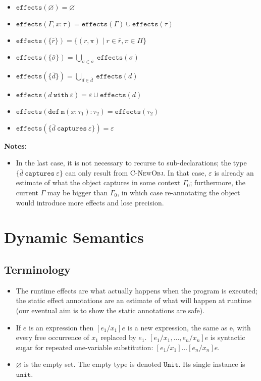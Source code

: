 \documentclass{llncs}
\newcommand{\keywadj}[1]{\mathtt{#1}}
\newcommand{\keyw}[1]{\keywadj{#1}~}
\begin{document}
\begin{itemize}
	\item $\keywadj{effects}(\varnothing) = \varnothing$
	\item $\keywadj{effects}(\Gamma, x : \tau) = \keywadj{effects}(\Gamma) \cup \keywadj{effects}(\tau)$
	\item $\keywadj{effects}(\{\bar r\}) = \{ (r, \pi) \mid r \in \bar r, \pi \in \Pi \}$
	\item $\keywadj{effects}(\{\bar \sigma\}) = \bigcup_{\sigma \in \bar \sigma}~\keywadj{effects}(\sigma)$
	\item $\keywadj{effects}(\{\bar d\}) = \bigcup_{d \in \bar d}~\keywadj{effects}(d)$
	\item $\keywadj{effects}(d~\keyw{with} \varepsilon) = \varepsilon \cup \keywadj{effects}(d)$
	\item $\keywadj{effects}(\keywadj{def~m}(x : \tau_1) : \tau_2) = \keywadj{effects}(\tau_2)$
	\item $\keywadj{effects}(\{\bar d ~\keyw{captures} \varepsilon\}) = \varepsilon$
\end{itemize}

\noindent \textbf{Notes:}
\begin{itemize}
	\item In the last case, it is not necessary to recurse to sub-declarations; the type $\{ \bar d~\keyw{captures} \varepsilon \}$ can only result from \textsc{C-NewObj}. In that case, $\varepsilon$ is already an estimate of what the object captures in some context $\Gamma_0$; furthermore, the current $\Gamma$ may be bigger than $\Gamma_0$, in which case re-annotating the object would introduce more effects and lose precision.
\end{itemize}
\newpage


\section{Dynamic Semantics}

\subsection{Terminology}

\begin{itemize}
	\item The runtime effects are what actually happens when the program is executed; the static effect annotations are an estimate of what will happen at runtime (our eventual aim is to show the static annotations are safe).
	\item If $e$ is an expression then $[e_1/x_1]e$ is a new expression, the same as e, with every free occurrence of $x_1$ replaced by $e_1$. $[e_1/x_1, ..., e_n/x_n]e$ is syntactic sugar for repeated one-variable substitution: $[e_1/x_1]...[e_n/x_n]e$.
	\item $\varnothing$ is the empty set. The empty type is denoted $\keywadj{Unit}$. Its single instance is $\keywadj{unit}$.
\end{itemize}
\end{document}
